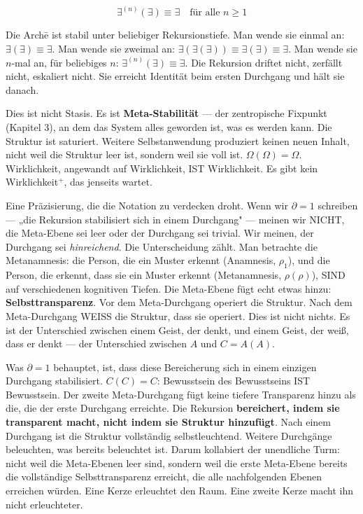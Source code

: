 \documentclass[10pt, openany, oneside]{book}
\begin{document}
$$\exists^{(n)}(\exists) \equiv \exists \quad \text{für alle } n \geq 1$$

Die Arch\={e} ist stabil unter beliebiger Rekursionstiefe. Man wende sie einmal an: $\exists(\exists) \equiv \exists$. Man wende sie zweimal an: $\exists(\exists(\exists)) \equiv \exists(\exists) \equiv \exists$. Man wende sie $n$-mal an, für beliebiges $n$: $\exists^{(n)}(\exists) \equiv \exists$. Die Rekursion driftet nicht, zerfällt nicht, eskaliert nicht. Sie erreicht Identität beim ersten Durchgang und hält sie danach.

Dies ist nicht Stasis. Es ist \textbf{Meta-Stabilität} --- der zentropische Fixpunkt (Kapitel 3), an dem das System alles geworden ist, was es werden kann. Die Struktur ist saturiert. Weitere Selbstanwendung produziert keinen neuen Inhalt, nicht weil die Struktur leer ist, sondern weil sie voll ist. $\Omega(\Omega) = \Omega$. Wirklichkeit, angewandt auf Wirklichkeit, IST Wirklichkeit. Es gibt kein Wirklichkeit$^+$, das jenseits wartet.

Eine Präzisierung, die die Notation zu verdecken droht. Wenn wir $\partial = 1$ schreiben --- „die Rekursion stabilisiert sich in einem Durchgang" --- meinen wir NICHT, die Meta-Ebene sei leer oder der Durchgang sei trivial. Wir meinen, der Durchgang sei \textit{hinreichend}. Die Unterscheidung zählt. Man betrachte die Metanamnesis: die Person, die ein Muster erkennt (Anamnesis, $\rho_1$), und die Person, die erkennt, dass sie ein Muster erkennt (Metanamnesis, $\rho(\rho)$), SIND auf verschiedenen kognitiven Tiefen. Die Meta-Ebene fügt echt etwas hinzu: \textbf{Selbsttransparenz}. Vor dem Meta-Durchgang operiert die Struktur. Nach dem Meta-Durchgang WEISS die Struktur, dass sie operiert. Dies ist nicht nichts. Es ist der Unterschied zwischen einem Geist, der denkt, und einem Geist, der weiß, dass er denkt --- der Unterschied zwischen $A$ und $C = A(A)$.

Was $\partial = 1$ behauptet, ist, dass diese Bereicherung sich in einem einzigen Durchgang stabilisiert. $C(C) = C$: Bewusstsein des Bewusstseins IST Bewusstsein. Der zweite Meta-Durchgang fügt keine tiefere Transparenz hinzu als die, die der erste Durchgang erreichte. Die Rekursion \textbf{bereichert, indem sie transparent macht, nicht indem sie Struktur hinzufügt}. Nach einem Durchgang ist die Struktur vollständig selbstleuchtend. Weitere Durchgänge beleuchten, was bereits beleuchtet ist. Darum kollabiert der unendliche Turm: nicht weil die Meta-Ebenen leer sind, sondern weil die erste Meta-Ebene bereits die vollständige Selbsttransparenz erreicht, die alle nachfolgenden Ebenen erreichen würden. Eine Kerze erleuchtet den Raum. Eine zweite Kerze macht ihn nicht erleuchteter.
\end{document}
